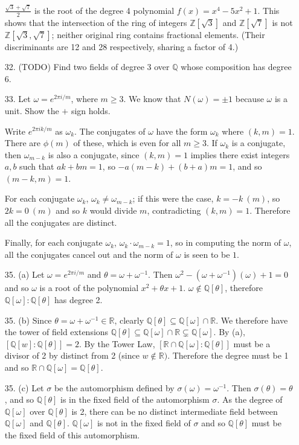 \documentclass{article}
\newcommand{\w}[0]{\omega}
\newcommand{\Q}[0]{\mathbb{Q}}
\newcommand{\R}[0]{\mathbb{R}}
\newcommand{\Z}[0]{\mathbb{Z}}
\begin{document}
\begin{enumerate}
$\frac{\sqrt{3} + \sqrt{7}}{2}$ is the root of the degree 4 polynomial $f(x) = x^4 - 5x^2 + 1$.  This shows that the intersection of the ring of integers $\Z[\sqrt{3}]$ and $\Z[\sqrt{7}]$ is not $\Z[\sqrt{3}, \sqrt{7}]$; neither original ring contains fractional elements.  (Their discriminants are 12 and 28 respectively, sharing a factor of 4.)

\item[32.]{(TODO)} Find two fields of degree 3 over $\Q$ whose composition has degree 6.

\item[33.] Let $\w = e^{2\pi i / m}$, where $m \ge 3$.  We know that $N(\w) = \pm 1$ because $\w$ is a unit.  Show the $+$ sign holds.

Write $e^{2\pi i k /m}$ as $\w_k$.  The conjugates of $\w$ have the form $\w_k$ where $(k, m) = 1$.  There are $\phi(m)$ of these, which is even for all $m \ge 3$.  If $\w_k$ is a conjugate, then $\w_{m - k}$ is also a conjugate, since $(k, m) = 1$ implies there exist integers $a, b$ such that $ak + bm = 1$, so $-a(m - k) + (b + a)m = 1$, and so $(m - k, m) = 1$.

For each conjugate $\w_k$, $\w_k \ne \w_{m - k}$; if this were the case, $k = -k \ (m)$, so $2k = 0 \ (m)$ and so $k$ would divide $m$, contradicting $(k, m) = 1$.  Therefore all the conjugates are distinct.

Finally, for each conjugate $\w_{k}$, $\w_k \cdot \w_{m - k} = 1$, so in computing the norm of $\w$, all the conjugates cancel out and the norm of $\w$ is seen to be $1$.

\item[35. (a)]  Let $\w = e^{2\pi i /m}$ and $\theta = \w + \w^{-1}$.  Then $\w^2 - (\w + \w^{-1})(\w) + 1 = 0$ and so $\w$ is a root of the polynomial $x^2 + \theta x + 1$.  $\w \not\in \Q[\theta]$, therefore $\Q[\w] : \Q[\theta]$ has degree 2.

\item[35. (b)]  Since $\theta = \w + \w^{-1} \in \R$, clearly $\Q[\theta]  \subseteq \Q[\w] \cap \R$.  We therefore have the tower of field extensions $\Q[\theta] \subseteq \Q[\w] \cap \R \subsetneq \Q[\w]$.  By (a), $[\Q[w] : \Q[\theta]] = 2$.  By the Tower Law, $[\R \cap \Q[\w] : \Q[\theta]]$ must be a divisor of 2 by distinct from 2 (since $w \not\in \R)$.  Therefore the degree must be 1 and so $\R \cap \Q[\w] = \Q[\theta]$.

\item[35. (c)]  Let $\sigma$ be the automorphism defined by $\sigma(\w) = \w^{-1}$.  Then $\sigma(\theta) = \theta$, and so $\Q[\theta]$ is in the fixed field of the automorphism $\sigma$.  As the degree of $\Q[\w]$ over $\Q[\theta]$ is 2, there can be no distinct intermediate field between $\Q[\w]$ and $\Q[\theta]$.  $\Q[\w]$ is not in the fixed field of $\sigma$ and so $\Q[\theta]$ must be the fixed field of this automorphism.


\end{enumerate}
\end{document}
